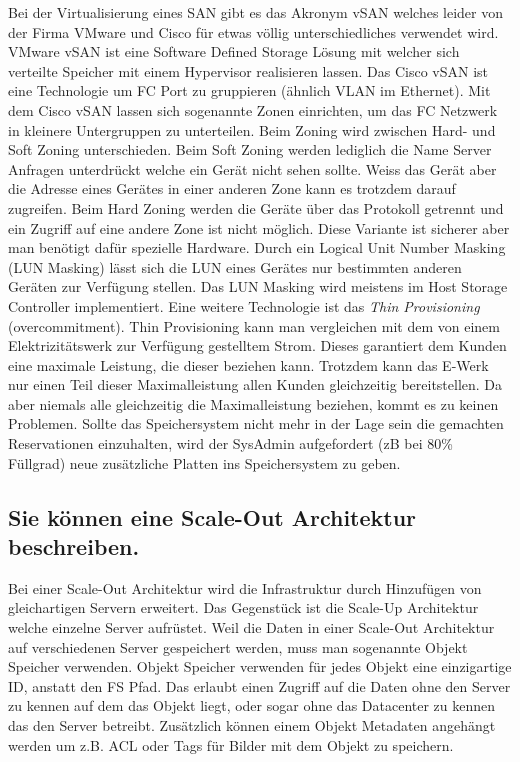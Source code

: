 Bei der Virtualisierung eines SAN gibt es das Akronym vSAN welches leider von der Firma VMware und Cisco für etwas völlig unterschiedliches verwendet wird. VMware vSAN ist eine Software Defined Storage Lösung mit welcher sich verteilte Speicher mit einem Hypervisor realisieren lassen. 
Das Cisco vSAN ist eine Technologie um FC Port zu gruppieren (ähnlich VLAN im Ethernet). Mit dem Cisco vSAN lassen sich sogenannte Zonen einrichten, um das FC Netzwerk in kleinere Untergruppen zu unterteilen. Beim Zoning wird zwischen Hard-  und Soft Zoning unterschieden. Beim Soft Zoning werden lediglich die Name Server Anfragen unterdrückt welche ein Gerät nicht sehen sollte. Weiss das Gerät aber die Adresse eines Gerätes in einer anderen Zone kann es trotzdem darauf zugreifen. Beim Hard Zoning werden die Geräte über das Protokoll getrennt und ein Zugriff auf eine andere Zone ist nicht möglich. Diese Variante ist sicherer aber man benötigt dafür spezielle Hardware. Durch ein Logical Unit Number Masking (LUN Masking) lässt sich die LUN eines Gerätes nur bestimmten anderen Geräten zur Verfügung stellen. Das LUN Masking wird meistens im Host Storage Controller implementiert.
Eine weitere Technologie ist das \emph{Thin Provisioning} (overcommitment). Thin Provisioning kann man vergleichen mit dem von einem Elektrizitätswerk zur Verfügung gestelltem Strom. Dieses garantiert dem Kunden eine maximale Leistung, die dieser beziehen kann. Trotzdem kann das E-Werk nur einen Teil dieser Maximalleistung allen Kunden gleichzeitig bereitstellen. Da aber niemals alle gleichzeitig die Maximalleistung beziehen, kommt es zu keinen Problemen. Sollte das Speichersystem nicht mehr in der Lage sein die gemachten
Reservationen einzuhalten, wird der SysAdmin aufgefordert (zB bei 80\% Füllgrad) neue zusätzliche Platten ins Speichersystem zu geben.

\subsection{Sie können eine Scale-Out Architektur beschreiben.}

Bei einer Scale-Out Architektur wird die Infrastruktur durch Hinzufügen von gleichartigen Servern erweitert. Das Gegenstück ist die Scale-Up Architektur welche einzelne Server aufrüstet. Weil die Daten in einer Scale-Out Architektur auf verschiedenen Server gespeichert werden, muss man sogenannte Objekt Speicher verwenden. Objekt Speicher verwenden für jedes Objekt eine einzigartige ID, anstatt den FS Pfad. Das erlaubt einen Zugriff auf die Daten ohne den Server zu kennen auf dem das Objekt liegt, oder sogar ohne das Datacenter zu kennen das den Server betreibt. Zusätzlich können einem Objekt Metadaten angehängt werden um z.B. ACL oder Tags für Bilder mit dem Objekt zu speichern.